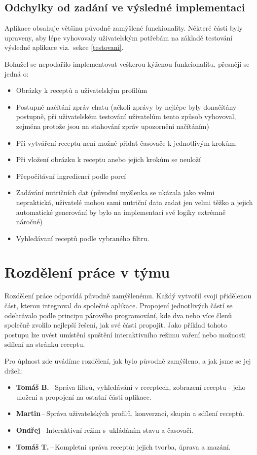 \documentclass[a4paper, 11pt]{article}
\begin{document}
\subsection{Odchylky od zadání ve výsledné implementaci}

Aplikace obsahuje většinu původně zamýšlené funckionality. Některé
části byly upraveny, aby lépe vyhovovaly uživatelským potřebám na základě testování
výsledné aplikace viz.\ sekce \ref{testovani}.

Bohužel se nepodařilo implementovat veškerou kýženou funkcionalitu, přesněji se jedná o:
\begin{itemize}
    \item Obrázky k receptů a uživatelským profilům
    \item Postupné načítání zpráv chatu (ačkoli zprávy by nejlépe byly donačítány postupně,
        při uživatelském testování uživatelům tento způsob vyhovoval, zejména protože
        jsou na stahování zpráv upozorněni načítáním)
    \item Při vytváření receptu není možné přidat časovače k jednotlivým krokům.
    \item Při vložení obrázku k receptu anebo jejich krokům se neuloží
    \item Přepočítávní ingrediencí podle porcí
    \item Zadávání nutričních dat (původní myšlenka se ukázala jako velmi nepraktická,
        uživatelé mohou sami nutriční data zadat jen velmi těžko a jejich automatické
        generování by bylo na implementaci své logiky extrémně náročné)
    \item Vyhledávaní receptů podle vybraného filtru.
\end{itemize}

\section{Rozdělení práce v týmu}

Rozdělení práce odpovídá původně zamýšlenému. Každý vytvořil svoji přidělenou část, kterou
integroval do společné aplikace. Propojení jednotlivých částí se odehrávalo podle
principu párového programování, kde dva nebo více členů společně zvolilo nejlepší řešení,
jak své části propojit. Jako příklad tohoto postupu lze uvést umístění spuštění
interaktivního režimu vaření nebo možnosti sdílení na stránku receptu.

Pro úplnost zde uvádíme rozdělení, jak bylo původně zamýšleno, a jak jsme se jej drželi:
\begin{itemize}
    \item \textbf{Tomáš B.}\,--\,Správa filtrů, vyhledávání v receptech, zobrazení receptu - jeho uložení a propojení na ostatní části aplikace. 
    \item \textbf{Martin}\,--\,Správa uživatelských profilů, konverzací, skupin a sdílení receptů.
    \item \textbf{Ondřej}\,--\,Interaktivní režim s~ukládáním stavu a časovači.
    \item \textbf{Tomáš T.}\,--\,Kompletní správa receptů: jejich tvorba, úprava a mazání.
\end{itemize}
\end{document}
